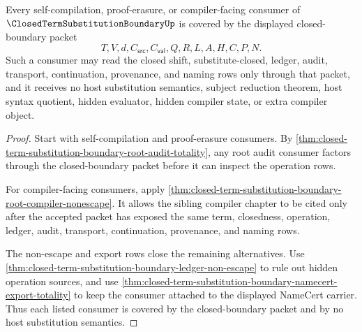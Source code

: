 \begin{theorem}
\label{thm:closed-term-substitution-boundary-root-consumer-coverage}
Every self-compilation, proof-erasure, or compiler-facing consumer of $\ClosedTermSubstitutionBoundaryUp$ is covered by the displayed closed-boundary packet
$$
T,V,d,C_{\mathsf{src}},C_{\mathsf{val}},Q,R,L,A,H,C,P,N.
$$
Such a consumer may read the closed shift, substitute-closed, ledger, audit, transport, continuation, provenance, and naming rows only through that packet, and it receives no host substitution semantics, subject reduction theorem, host syntax quotient, hidden evaluator, hidden compiler state, or extra compiler object.
\end{theorem}
\begin{proof}
Start with self-compilation and proof-erasure consumers. By \autoref{thm:closed-term-substitution-boundary-root-audit-totality}, any root audit consumer factors through the closed-boundary packet before it can inspect the operation rows.

For compiler-facing consumers, apply \autoref{thm:closed-term-substitution-boundary-root-compiler-nonescape}. It allows the sibling compiler chapter to be cited only after the accepted packet has exposed the same term, closedness, operation, ledger, audit, transport, continuation, provenance, and naming rows.

The non-escape and export rows close the remaining alternatives. Use \autoref{thm:closed-term-substitution-boundary-ledger-non-escape} to rule out hidden operation sources, and use \autoref{thm:closed-term-substitution-boundary-namecert-export-totality} to keep the consumer attached to the displayed NameCert carrier. Thus each listed consumer is covered by the closed-boundary packet and by no host substitution semantics.
\end{proof}

